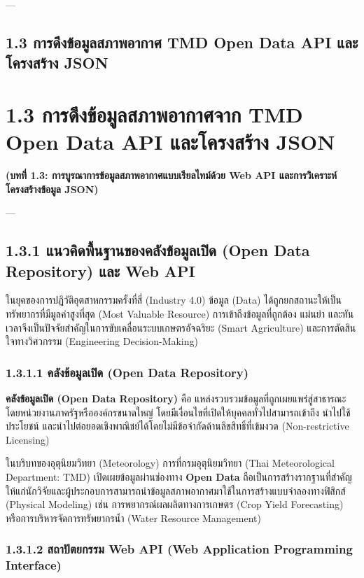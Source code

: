 \documentclass[11pt,a4paper,openany]{report}
\begin{document}
---

\section{1.3 การดึงข้อมูลสภาพอากาศ TMD Open Data API และโครงสร้าง JSON}


\chapter{1.3 การดึงข้อมูลสภาพอากาศจาก TMD Open Data API และโครงสร้าง JSON}


\textbf{(บทที่ 1.3: การบูรณาการข้อมูลสภาพอากาศแบบเรียลไทม์ด้วย Web API และการวิเคราะห์โครงสร้างข้อมูล JSON)}

---

\section{1.3.1 แนวคิดพื้นฐานของคลังข้อมูลเปิด (Open Data Repository) และ Web API}


ในยุคของการปฏิวัติอุตสาหกรรมครั้งที่สี่ (Industry 4.0) ข้อมูล (Data) ได้ถูกยกสถานะให้เป็นทรัพยากรที่มีมูลค่าสูงที่สุด (Most Valuable Resource) การเข้าถึงข้อมูลที่ถูกต้อง แม่นยำ และทันเวลาจึงเป็นปัจจัยสำคัญในการขับเคลื่อนระบบเกษตรอัจฉริยะ (Smart Agriculture) และการตัดสินใจทางวิศวกรรม (Engineering Decision-Making)

\subsection{1.3.1.1 คลังข้อมูลเปิด (Open Data Repository)}


\textbf{คลังข้อมูลเปิด (Open Data Repository)} คือ แหล่งรวบรวมข้อมูลที่ถูกเผยแพร่สู่สาธารณะโดยหน่วยงานภาครัฐหรือองค์กรขนาดใหญ่ โดยมีเงื่อนไขที่เปิดให้บุคคลทั่วไปสามารถเข้าถึง นำไปใช้ประโยชน์ และนำไปต่อยอดเชิงพาณิชย์ได้โดยไม่มีข้อจำกัดด้านลิขสิทธิ์ที่เข้มงวด (Non-restrictive Licensing)

ในบริบทของอุตุนิยมวิทยา (Meteorology) การที่กรมอุตุนิยมวิทยา (Thai Meteorological Department: TMD) เปิดเผยข้อมูลผ่านช่องทาง \textbf{Open Data} ถือเป็นการสร้างรากฐานที่สำคัญให้แก่นักวิจัยและผู้ประกอบการสามารถนำข้อมูลสภาพอากาศมาใช้ในการสร้างแบบจำลองทางฟิสิกส์ (Physical Modeling) เช่น การพยากรณ์ผลผลิตทางการเกษตร (Crop Yield Forecasting) หรือการบริหารจัดการทรัพยากรน้ำ (Water Resource Management)

\subsection{1.3.1.2 สถาปัตยกรรม Web API (Web Application Programming Interface)}
\end{document}
